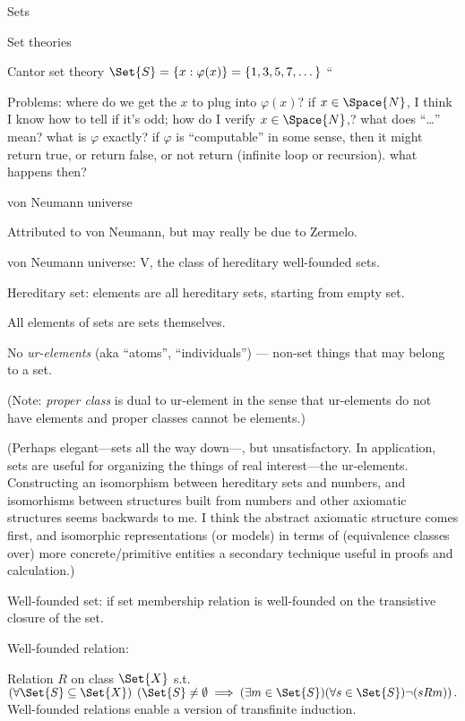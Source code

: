 \begin{plSection}{Sets}
\begin{plSection}{Set theories}
\begin{plSection}{Cantor set theory}
$\Set{S}=\{x:\varphi(x)\}=\{1,3,5,7,\dots\}$ ``\cite{iep:SetTheory}

Problems: \hfill\break
where do we get the $x$ to plug into $\varphi(x)$?\hfill\break
if $x\in\Space{N}$, I think I know how to tell if it's odd;
how do I verify $x\in\Space{N}$,?\hfill\break
what does ``\dots'' mean?\hfill\break
what is $\varphi$ exactly?\hfill\break
if $\varphi$ is ``computable'' in some sense,
then it might return true, or return false, or not return
(infinite loop or recursion). what happens then?
\end{plSection}%
\begin{plSection}{von Neumann universe}
\label{sec:von_Neumann_universe}

Attributed to von Neumann, but may really be due to
Zermelo\cite{Zermelo:1930:SetTheory}.

von Neumann universe: \textsf{V}\cite{wiki:VonNeumannUniverse},
the class of hereditary well-founded sets.

Hereditary set: elements are all hereditary sets, 
starting from empty set\cite{wiki:HereditarySet}.

All elements of sets are sets themselves.

No \textsl{ur-elements}\cite{wiki:Urelement} 
(aka ``atoms'', ``individuals'') ---
non-set things that may belong to a set.

(Note: \textsl{proper class} is dual to ur-element in the sense that
ur-elements do not have elements and proper classes cannot be 
elements.)

(Perhaps elegant---sets all the way down---, but unsatisfactory. 
In application, sets are useful for organizing the things
of real interest---the ur-elements.
Constructing an isomorphism between hereditary sets
and numbers, and isomorhisms between structures built
from numbers and other axiomatic structures seems
backwards to me.
I think the abstract axiomatic structure comes first, 
and isomorphic representations (or models) in terms of 
(equivalence classes over) more concrete/primitive
entities a secondary technique useful in proofs and calculation.)

Well-founded set: if set membership relation
is well-founded on the transistive closure of the set.

Well-founded relation\cite{wiki:WellFoundedRelation}: 
 
Relation $R$ on class $\Set{X}$ s.t. 
$(\forall \Set{S} \subseteq \Set{X})
\; \left(\Set{S} \neq \emptyset \implies 
(\exists m \in \Set{S})(\forall s\in \Set{S})\lnot (sRm)\right).$
Well-founded relations enable a version of transfinite induction.


\end{plSection}
\end{plSection}
\end{plSection}
